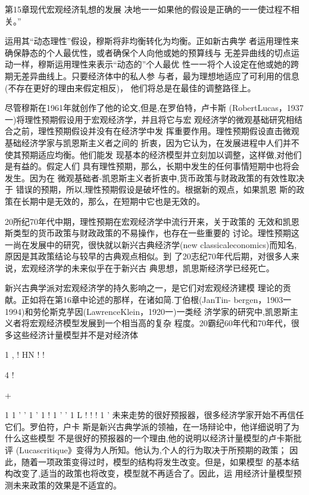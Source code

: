 第15章现代宏观经济轧想的发展
决地一一如果他的假设是正确的一一使过程不相关。”

运用其“动态理性”假设，穆斯将非均衡转化为均衡。正如新古典学
者运用理性来确保静态的个人最优性，或者确保个人向他或她的预算线与
无差异曲线的切点运动一样，穆斯运用理性来表示“动态的”个人最优
性一一将个人设定在他或她的跨期无差异曲线上。只要经济体中的私人参
与者，最为理想地适应了可利用的信息(不存在更好的理由来假定相反)，
他们将总是在最佳的调整路径上。

尽管穆斯在1961年就创作了他的论文,但是,在罗伯特，卢卡斯
(RobertLucas，1937一)将理性预期假设用于宏观经济学，并且将它与宏
观经济学的微观基础研究相结合之前，理性预期假设并没有在经济学中发
挥重要作用。理性预期假设直击微观基础经济学家与凯恩斯主义者之间的
折衷，因为它认为，在发展进程中人们并不使其预期适应均衡。他们能发
现基本的经济模型并立刻加以调整，这样做,对他们是有益的。假定人们
具有理性预期，那么，长期中发生的任何事情短期中也将会发生。因为在
微观基础者-凯恩斯主义者折衷中,货币政策与财政政策的有效性取决于
错误的预期，所以,理性预期假设是破坏性的。根据新的观点，如果凯恩
斯的政策在长期中是无效的，那么，在短期中它也是无效的。

20所纪70年代中期，理性预期在宏观经济学中流行开来，关于政策的
无效和凯恩斯类型的货币政策与财政政策的不易操作，也存在一些重要的
讨论。理性预期这一尚在发展中的研究，很快就以新兴古典经济学(new
classicaleconomics)而知名,原因是其政策结论与较早的古典观点相似。到
了20志纪70年代后期，对很多人来说，宏观经济学的未来似乎在于新兴古
典思想，凯思斯经济学已经死亡。

新兴古典学派对宏观经济学的持久影响之一，是它们对宏观经济建模
理论的贡献。正如将在第16章中论述的那样，在诸如简.丁伯根(JanTin-
bergen，1903一1994)和劳伦斯克芋因(LawrenceKlein，1920一)一类经
济学家的研究中,凯恩斯主义者将宏观经济模型发展到一个相当高的复杂
程度。20霸纪60年代和70年代，很多这些经济计量模型并不是对经济体


1
,
!
HN
!
!

4
!

+

1
1
'
'
1
'
1
!
1
'
'
1
L
!
!
!
1
'
未来走势的很好预报器，很多经济学家开始不再信任它们。罗伯符，户卡
斯是新兴古典学派的领袖，在一场辩论中，他详细说明了为什么这些模型
不是很好的预报器的一个理由,他的说明以经济计量模型的卢卡斯批评
(Lucascritique》变得为人所知。他认为,个人的行为取决于所预期的政策；
因此，随着一项政策变得过时，模型的结构将发生改变。但是，如果模型
的基本结构改变了,适当的政策也将改变，模型就不再适合了。因此，运
用经济计量模型预测未来政策的效果是不适宜的。

